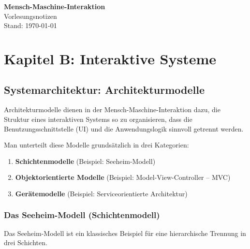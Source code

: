\documentclass[12pt, a4paper]{article}
\begin{document}
\begin{center}
  {\LARGE\bfseries Mensch-Maschine-Interaktion}\\[6pt]
  {\large Vorlesungsnotizen}\\[4pt]
  {\small Stand: \today}
\end{center}

\vspace{1em}
\tableofcontents
\newpage

\section{Kapitel B: Interaktive Systeme}

\subsection{Systemarchitektur: Architekturmodelle}

Architekturmodelle dienen in der Mensch-Maschine-Interaktion dazu, die Struktur eines
interaktiven Systems so zu organisieren, dass die Benutzungsschnittstelle (UI) und die
Anwendungslogik sinnvoll getrennt werden.

Man unterteilt diese Modelle grundsätzlich in drei Kategorien:

\begin{enumerate}
  \item \textbf{Schichtenmodelle} (Beispiel: Seeheim-Modell)
  \item \textbf{Objektorientierte Modelle} (Beispiel: Model-View-Controller -- MVC)
  \item \textbf{Gerätemodelle} (Beispiel: Serviceorientierte Architektur)
\end{enumerate}

\subsubsection{Das Seeheim-Modell (Schichtenmodell)}

Das Seeheim-Modell ist ein klassisches Beispiel für eine hierarchische Trennung in drei
Schichten.
\end{document}
